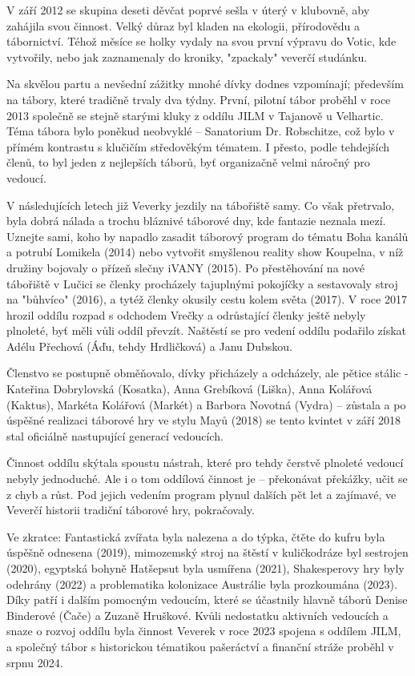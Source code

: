 V září 2012 se skupina deseti děvčat poprvé sešla v úterý v klubovně,
aby zahájila svou činnost. Velký důraz byl kladen na ekologii,
přírodovědu a tábornictví. Téhož měsíce se holky vydaly na svou první
výpravu do Votic, kde vytvořily, nebo jak zaznamenaly do kroniky,
"zpackaly" veverčí studánku.

Na skvělou partu a nevšední zážitky mnohé dívky dodnes vzpomínají;
především na tábory, které tradičně trvaly dva týdny. První, pilotní
tábor proběhl v roce 2013 společně se stejně starými kluky z oddílu JILM
v Tajanově u Velhartic. Téma tábora bylo poněkud neobvyklé -- Sanatorium
Dr. Robschitze, což bylo v přímém kontrastu s klučičím středověkým
tématem. I přesto, podle tehdejších členů, to byl jeden z nejlepších
táborů, byť organizačně velmi náročný pro vedoucí.

V následujících letech již Veverky jezdily na tábořiště samy. Co však
přetrvalo, byla dobrá nálada a trochu bláznivé táborové dny, kde
fantazie neznala mezí. Uznejte sami, koho by napadlo zasadit táborový
program do tématu Boha kanálů a potrubí Lomikela (2014) nebo vytvořit
smyšlenou reality show Koupelna, v níž družiny bojovaly o přízeň slečny
iVANY (2015). Po přestěhování na nové tábořiště v Lučici se členky
procházely tajuplnými pokojíčky a sestavovaly stroj na "bůhvíco" (2016),
a tytéž členky okusily cestu kolem světa (2017). V roce 2017 hrozil
oddílu rozpad s odchodem Vrečky a odrůstající členky ještě nebyly
plnoleté, byť měli vůli oddíl převzít. Naštěstí se pro vedení oddílu
podařilo získat Adélu Přechová (Áďu, tehdy Hrdličková) a Janu Dubskou.

Členstvo se postupně obměňovalo, dívky přicházely a odcházely, ale
pětice stálic - Kateřina Dobrylovská (Kosatka), Anna Grebíková (Liška),
Anna Kolářová (Kaktus), Markéta Kolářová (Markét) a Barbora Novotná
(Vydra) -- zůstala a po úspěšné realizaci táborové hry ve stylu Mayů
(2018) se tento kvintet v září 2018 stal oficiálně nastupující generací
vedoucích.

Činnost oddílu skýtala spoustu nástrah, které pro tehdy čerstvě plnoleté
vedoucí nebyly jednoduché. Ale i o tom oddílová činnost je -- překonávat
překážky, učit se z chyb a růst. Pod jejich vedením program plynul
dalších pět let a zajímavé, ve Veverčí historii tradiční táborové hry,
pokračovaly.

Ve zkratce: Fantastická zvířata byla nalezena a do týpka, čtěte do kufru
byla úspěšně odnesena (2019), mimozemský stroj na štěstí v kuličkodráze
byl sestrojen (2020), egyptská bohyně Hatšepsut byla usmířena (2021),
Shakesperovy hry byly odehrány (2022) a problematika kolonizace
Austrálie byla prozkoumána (2023). Díky patří i dalším pomocným
vedoucím, které se účastnily hlavně táborů Denise Binderové (Čače) a
Zuzaně Hruškové. Kvůli nedostatku aktivních vedoucích a snaze o rozvoj
oddílu byla činnost Veverek v roce 2023 spojena s oddílem JILM, a
společný tábor s historickou tématikou pašeráctví a finanční stráže
proběhl v srpnu 2024.


